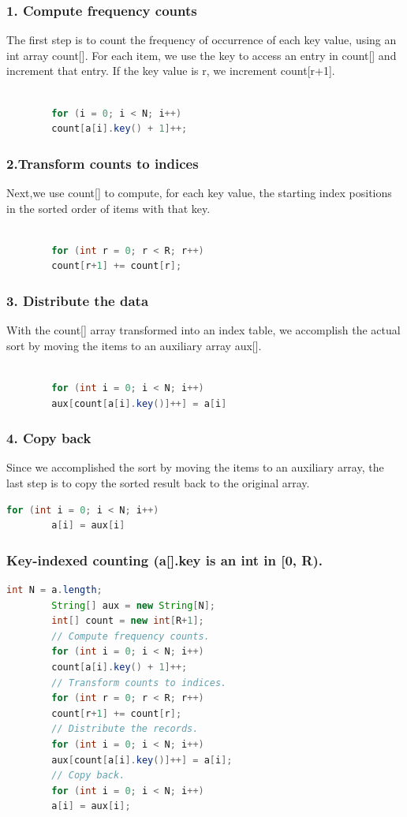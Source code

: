 \documentclass[11pt]{beamer}
\begin{document}
\begin{frame}[fragile]
	\frametitle{1. Compute frequency counts}
	The first step is to count the frequency of occurrence of each key value, using an int array count[]. For each item, we use the key to access an entry in count[] and increment that entry.  If the key value is r, we increment count[r+1].\\
	
	\begin{lstlisting}[language=Java]
		
		for (i = 0; i < N; i++)
		count[a[i].key() + 1]++;
	\end{lstlisting}
\end{frame}

\begin{frame}[fragile]
	\frametitle{2.Transform counts to indices }
	Next,we use count[] to compute, for each key value, the starting index positions in the sorted order of items with that key.\\
		\begin{lstlisting}[language=Java]
		
		for (int r = 0; r < R; r++)
		count[r+1] += count[r];
	\end{lstlisting}
\end{frame}

\begin{frame}[fragile]
	\frametitle{3. Distribute the data }
	With the count[] array transformed into an index table, we accomplish the actual sort by moving the items to an auxiliary array aux[]. \\
	\begin{lstlisting}[language=Java]
		
		for (int i = 0; i < N; i++)
		aux[count[a[i].key()]++] = a[i]
	\end{lstlisting}
\end{frame}

\begin{frame}[fragile]
	\frametitle{4. Copy back }
	Since we accomplished the sort by moving the items to an auxiliary array, the last step is to copy the sorted result back to the original array. \\
	\begin{lstlisting}[language=Java]
		for (int i = 0; i < N; i++)
		a[i] = aux[i]
	\end{lstlisting}
\end{frame}

\begin{frame}[fragile]
	\frametitle{Key-indexed counting (a[].key is an int in [0, R). }
	\begin{lstlisting}[language=Java]
		int N = a.length;
		String[] aux = new String[N];
		int[] count = new int[R+1];
		// Compute frequency counts.
		for (int i = 0; i < N; i++)
		count[a[i].key() + 1]++;
		// Transform counts to indices.
		for (int r = 0; r < R; r++)
		count[r+1] += count[r];
		// Distribute the records.
		for (int i = 0; i < N; i++)
		aux[count[a[i].key()]++] = a[i];
		// Copy back.
		for (int i = 0; i < N; i++)
		a[i] = aux[i];
		
	\end{lstlisting}
\end{frame}
\end{document}
